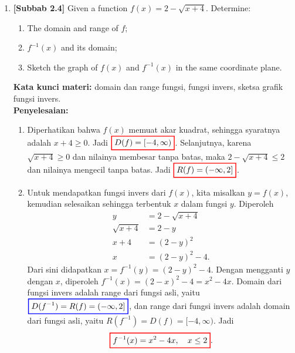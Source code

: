 \documentclass[10pt,openany,a4paper]{article}
\theoremstyle{definition}
\theoremstyle{definition}
\theoremstyle{plain}
\newenvironment{jawab}[2][tes]{%
\par\noindent\textbf{Kata kunci materi:} #1.\\
\textbf{Penyelesaian:} #2%
}{}
\begin{document}
\begin{enumerate}
    \item \textbf{[Subbab 2.4]} Given a function $f(x)=2-\sqrt{x+4}$. Determine:
    \begin{enumerate}
        \item[a)] The domain and range of $f$;
        \item[b)] $f^{-1}(x)$ and its domain;
        \item[c)] Sketch the graph of $f(x)$ and $f^{-1}(x)$ in the same coordinate plane.
    \end{enumerate}
    \begin{jawab}[domain dan range fungsi, fungsi invers, sketsa grafik fungsi invers]{
        \begin{enumerate}
            \item Diperhatikan bahwa $f(x)$ memuat akar kuadrat, sehingga syaratnya adalah $x+4\geq 0$. Jadi $\colorlet{oldcolor}{.}
        \color{red}
        \setlength{\fboxrule}{1pt} \boxed{\color{oldcolor}D(f)=[-4,\infty)}\color{oldcolor}$. Selanjutnya, karena $\sqrt{x+4}\geq 0$ dan nilainya membesar tanpa batas, maka $2-\sqrt{x+4}\leq 2$ dan nilainya mengecil tanpa batas. Jadi $\colorlet{oldcolor}{.}
        \color{red}
        \setlength{\fboxrule}{1pt} \boxed{\color{oldcolor}R(f)=(-\infty,2]}\color{oldcolor}$.
            \item Untuk mendapatkan fungsi invers dari $f(x)$, kita misalkan $y=f(x)$, kemudian selesaikan sehingga terbentuk $x$ dalam fungsi $y$. Diperoleh
            \begin{align*}
                y &= 2-\sqrt{x+4}\\
                \sqrt{x+4} &= 2-y\\
                x+4 &= (2-y)^2\\
                x &= (2-y)^2-4.
            \end{align*}
            Dari sini didapatkan $x = f^{-1}(y) = (2-y)^2-4$. Dengan mengganti $y$ dengan $x$, diperoleh $f^{-1}(x)=(2-x)^2-4=x^2-4x$. Domain dari fungsi invers adalah range dari fungsi asli, yaitu $\colorlet{oldcolor}{.}
        \color{blue}
        \setlength{\fboxrule}{1pt} \boxed{\color{oldcolor}D(f^{-1})=R(f)=(-\infty,2]}\color{oldcolor}$, dan range dari fungsi invers adalah domain dari fungsi asli, yaitu $R(f^{-1})=D(f)=[-4,\infty)$. Jadi
            \begin{align*}
                \colorlet{oldcolor}{.}
        \color{red}
        \setlength{\fboxrule}{1pt} \boxed{\color{oldcolor}f^{-1}(x)=x^2-4x,\quad x\leq 2}\color{oldcolor}.
            \end{align*}

\end{enumerate}}
\end{jawab}
\end{enumerate}
\end{document}
